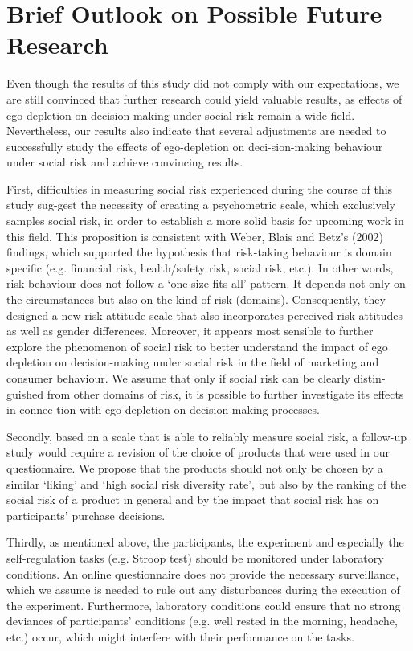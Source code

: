 \section{Brief Outlook on Possible Future Research}
Even though the results of this study did not comply with our expectations, we are still convinced that further research could yield valuable results, as effects of ego depletion on decision-making under social risk remain a wide field. Nevertheless, our results also indicate that several adjustments are needed to successfully study the effects of ego-depletion on deci-sion-making behaviour under social risk and achieve convincing results.\par
First, difficulties in measuring social risk experienced during the course of this study sug-gest the necessity of creating a psychometric scale, which exclusively samples social risk, in order to establish a more solid basis for upcoming work in this field. This proposition is consistent with Weber, Blais and Betz’s (2002) findings, which supported the hypothesis that risk-taking behaviour is domain specific (e.g. financial risk, health/safety risk, social risk, etc.). In other words, risk-behaviour does not follow a ‘one size fits all’ pattern. It depends not only on the circumstances but also on the kind of risk (domains). Consequently, they designed a new risk attitude scale that also incorporates perceived risk attitudes as well as gender differences. Moreover, it appears most sensible to further explore the phenomenon of social risk to better understand the impact of ego depletion on decision-making under social risk in the field of marketing and consumer behaviour. We assume that only if social risk can be clearly distin-guished from other domains of risk, it is possible to further investigate its effects in connec-tion with ego depletion on decision-making processes.\par
Secondly, based on a scale that is able to reliably measure social risk, a follow-up study would require a revision of the choice of products that were used in our questionnaire. We propose that the products should not only be chosen by a similar ‘liking’ and ‘high social risk diversity rate’, but also by the ranking of the social risk of a product in general and by the impact that social risk has on participants’ purchase decisions.\par
Thirdly, as mentioned above, the participants, the experiment and especially the self-regulation tasks (e.g. Stroop test) should be monitored under laboratory conditions. An online questionnaire does not provide the necessary surveillance, which we assume is needed to rule out any disturbances during the execution of the experiment. Furthermore, laboratory conditions could ensure that no strong deviances of participants’ conditions (e.g. well rested in the morning, headache, etc.) occur, which might interfere with their performance on the tasks. \par
